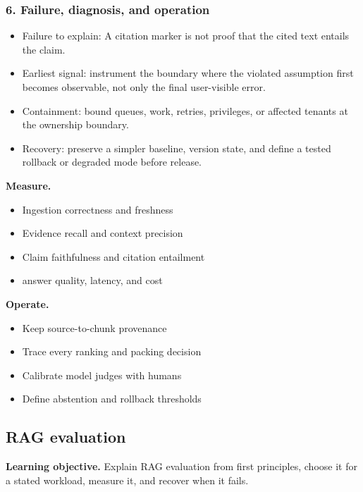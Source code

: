 \subsubsection*{6. Failure, diagnosis, and operation}
\begin{itemize}
\item Failure to explain: A citation marker is not proof that the cited text entails the claim.
\item Earliest signal: instrument the boundary where the violated assumption first becomes observable, not only the final user-visible error.
\item Containment: bound queues, work, retries, privileges, or affected tenants at the ownership boundary.
\item Recovery: preserve a simpler baseline, version state, and define a tested rollback or degraded mode before release.
\end{itemize}
\textbf{Measure.}\begin{itemize}
\item Ingestion correctness and freshness
\item Evidence recall and context precision
\item Claim faithfulness and citation entailment
\item answer quality, latency, and cost
\end{itemize}
\textbf{Operate.}\begin{itemize}
\item Keep source-to-chunk provenance
\item Trace every ranking and packing decision
\item Calibrate model judges with humans
\item Define abstention and rollback thresholds
\end{itemize}
\subsection{RAG evaluation}
\textbf{Learning objective.} Explain RAG evaluation from first principles, choose it for a stated workload, measure it, and recover when it fails.
